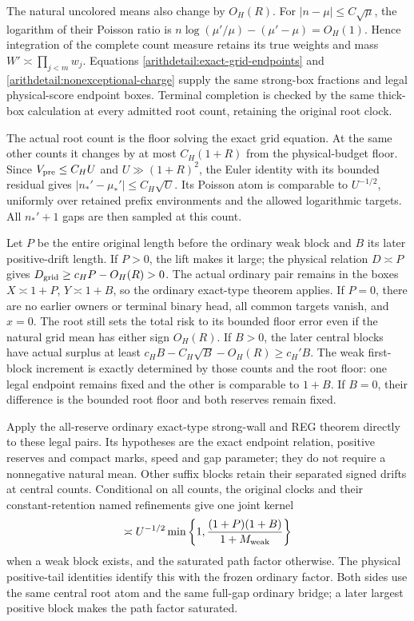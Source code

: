 The natural uncolored means also change by $O_H(R)$.
For $|n-\mu|\leq C\sqrt\mu$, the logarithm of their Poisson ratio is
$n\log(\mu'/\mu)-(\mu'-\mu)=O_H(1)$.
Hence integration of the complete count measure retains its true
weights and mass $W'\asymp\prod_{j<m}w_j$.
Equations \eqref{arithdetail:exact-grid-endpoints} and
\eqref{arithdetail:nonexceptional-charge} supply the same strong-box
fractions and legal physical-score endpoint boxes. Terminal completion
is checked by the same thick-box calculation at every admitted root
count, retaining the original root clock.

The actual root count is the floor solving the exact grid equation.
At the same other counts it changes by at most $C_H(1+R)$ from the
physical-budget floor. Since $V_{\rm pre}\leq C_HU$ and
$U\gg(1+R)^2$, the Euler identity with its bounded residual gives
$|n_*'-\mu_*'|\leq C_H\sqrt U$. Its Poisson atom is comparable to
$U^{-1/2}$, uniformly over retained prefix environments and the
allowed logarithmic targets. All $n_*'+1$ gaps are then sampled at
this count.

Let $P$ be the entire original length before the ordinary weak block
and $B$ its later positive-drift length. If $P>0$, the lift makes it
large; the physical relation $D\asymp P$ gives
$D_{\rm grid}\geq c_HP-O_H(R)>0$. The actual ordinary pair remains
in the boxes $X\asymp1+P$, $Y\asymp1+B$, so the ordinary exact-type
theorem applies. If $P=0$, there are no earlier owners or terminal
binary head, all common targets vanish, and $x=0$. The root still
sets the total risk to its bounded floor error even if the natural
grid mean has either sign $O_H(R)$. If $B>0$, the later central
blocks have actual surplus at least
$c_HB-C_H\sqrt B-O_H(R)\geq c_H'B$. The weak first-block increment
is exactly determined by those counts and the root floor: one legal
endpoint remains fixed and the other is comparable to $1+B$.
If $B=0$, their difference is the bounded root floor and both
reserves remain fixed.

Apply the all-reserve ordinary exact-type strong-wall and REG theorem
directly to these legal pairs. Its hypotheses are the exact endpoint
relation, positive reserves and compact marks, speed and gap parameter;
they do not require a nonnegative natural mean. Other suffix blocks
retain their separated signed drifts at central counts. Conditional
on all counts, the original clocks and their constant-retention named
refinements give one joint kernel
\[
 \asymp U^{-1/2}
 \min\left\{1,\frac{(1+P)(1+B)}{1+M_{\rm weak}}\right\}
\]
when a weak block exists, and the saturated path factor otherwise.
The physical positive-tail identities identify this with the frozen
ordinary factor. Both sides use the same central root atom and the
same full-gap ordinary bridge; a later largest positive block makes
the path factor saturated.

